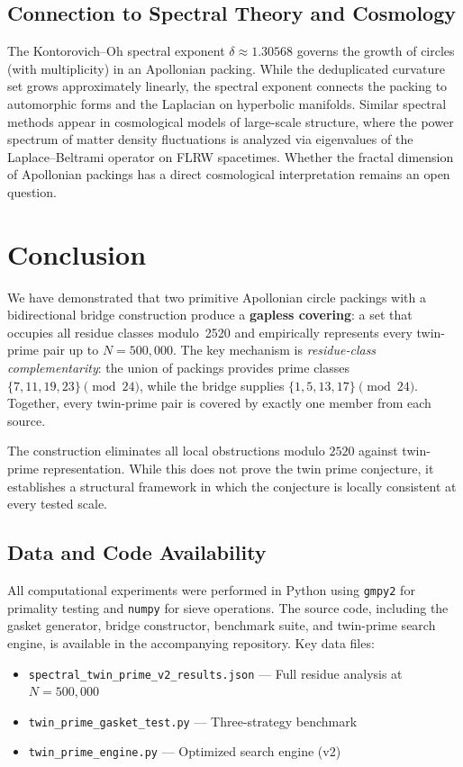 \documentclass[12pt,a4paper]{article}
\theoremstyle{remark}
\begin{document}
\subsection{Connection to Spectral Theory and Cosmology}

The Kontorovich--Oh spectral exponent $\delta \approx 1.30568$ governs
the growth of circles (with multiplicity) in an Apollonian packing. While
the deduplicated curvature set grows approximately linearly, the spectral
exponent connects the packing to automorphic forms and the Laplacian on
hyperbolic manifolds. Similar spectral methods appear in cosmological
models of large-scale structure, where the power spectrum of matter
density fluctuations is analyzed via eigenvalues of the Laplace--Beltrami
operator on FLRW spacetimes. Whether the fractal dimension of Apollonian
packings has a direct cosmological interpretation remains an open question.

\section{Conclusion}

We have demonstrated that two primitive Apollonian circle packings with
a bidirectional bridge construction produce a \textbf{gapless covering}:
a set that occupies all residue classes modulo~2520 and empirically
represents every twin-prime pair up to $N = 500{,}000$. The key mechanism
is \emph{residue-class complementarity}: the union of packings provides
prime classes $\{7,11,19,23\} \pmod{24}$, while the bridge supplies
$\{1,5,13,17\} \pmod{24}$. Together, every twin-prime pair is covered
by exactly one member from each source.

The construction eliminates all local obstructions modulo $2520$ against
twin-prime representation. While this does not prove the twin prime
conjecture, it establishes a structural framework in which the conjecture
is locally consistent at every tested scale.

\subsection*{Data and Code Availability}

All computational experiments were performed in Python using \texttt{gmpy2}
for primality testing and \texttt{numpy} for sieve operations. The source
code, including the gasket generator, bridge constructor, benchmark suite,
and twin-prime search engine, is available in the accompanying repository.
Key data files:
\begin{itemize}
\item \texttt{spectral\_twin\_prime\_v2\_results.json} --- Full residue
analysis at $N = 500{,}000$
\item \texttt{twin\_prime\_gasket\_test.py} --- Three-strategy benchmark
\item \texttt{twin\_prime\_engine.py} --- Optimized search engine (v2)
\end{itemize}
\end{document}
